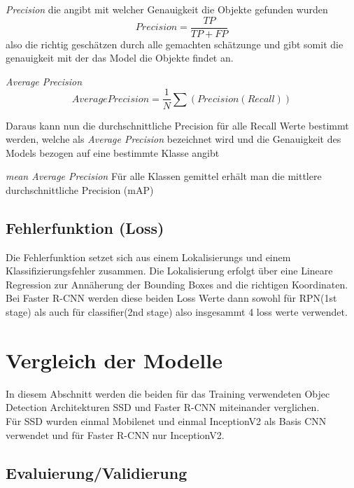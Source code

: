 \textit{Precision}
die angibt mit welcher Genauigkeit die Objekte gefunden wurden
\begin{equation}
  Precision = \frac{TP}{TP + FP}
\end{equation}
also die richtig 
geschätzen durch alle gemachten schätzunge und gibt somit die 
genauigkeit mit der das Model die Objekte findet an.


\textit{Average Precision}
\begin{equation}
  Average Precision = \frac{1}{N}\sum(Precision(Recall))
\end{equation}

Daraus kann nun die durchschnittliche Precision für alle Recall 
Werte bestimmt werden, welche als \textit{Average Precision}
bezeichnet wird und die Genauigkeit des Models bezogen auf 
eine bestimmte Klasse angibt

\textit{mean Average Precision}
Für alle Klassen gemittel 
erhält man die mittlere durchschnittliche Precision (mAP)



\subsection*{Fehlerfunktion (Loss)}
Die Fehlerfunktion setzet sich aus einem Lokalisierungs und einem 
Klassifizierungsfehler zusammen. 
Die Lokalisierung erfolgt über eine Lineare Regression zur 
Annäherung der Bounding Boxes and die richtigen Koordinaten.\\

Bei Faster R-CNN werden diese beiden Loss Werte dann sowohl für 
RPN(1st stage) als auch für classifier(2nd stage) also 
insgesammt 4 loss werte verwendet.



\section{Vergleich der Modelle}\label{sec:model_vergleich}
In diesem Abschnitt werden die beiden für das Training verwendeten
Objec Detection Architekturen SSD und Faster R-CNN miteinander 
verglichen.\\
Für SSD wurden einmal Mobilenet und einmal InceptionV2 als 
Basis CNN verwendet und für Faster R-CNN nur InceptionV2.



\subsection{Evaluierung/Validierung}

